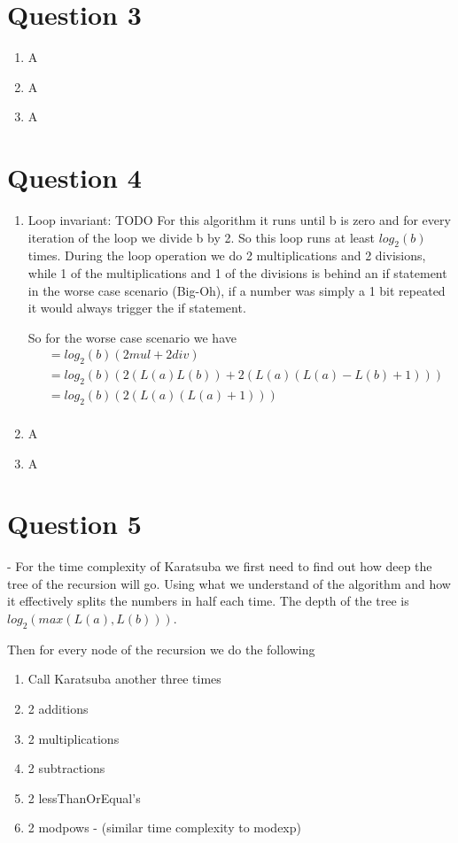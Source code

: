 \documentclass[journal,a4paper]{IEEEtran}
\begin{document}
\section*{Question 3}
\begin{enumerate}
	\item A
	\item A
	\item A
\end{enumerate}

\section*{Question 4}
\begin{enumerate}
	\item Loop invariant: TODO
		  For this algorithm it runs until b is zero and for every iteration of the loop we divide b by 2. So this loop runs at least $log_2(b)$ times. During the loop operation we do 2 multiplications and 2 divisions, while 1 of the multiplications and 1 of the divisions is behind an if statement in the worse case scenario (Big-Oh), if a number was simply a 1 bit repeated it would always trigger the if statement.
		  
		  So for the worse case scenario we have
		  \begin{align*}
		  	&= log_2(b)(2mul + 2div) \\
		  	&= log_2(b)(2(L(a)L(b)) + 2(L(a)(L(a)-L(b)+1))) \\
		  	&= log_2(b)(2(L(a)(L(a)+1))) \\
		  \end{align*}
	\item A
	\item A
\end{enumerate}

\section*{Question 5}
- For the time complexity of Karatsuba we first need to find out how deep the tree of the recursion will go. Using what we understand of the algorithm and how it effectively splits the numbers in half each time. The depth of the tree is $log_2(max(L(a),L(b)))$.

Then for every node of the recursion we do the following
\begin{enumerate}
	\item Call Karatsuba another three times
	\item 2 additions
	\item 2 multiplications
	\item 2 subtractions
	\item 2 lessThanOrEqual's
	\item 2 modpows - (similar time complexity to modexp)	
\end{enumerate}
\end{document}
